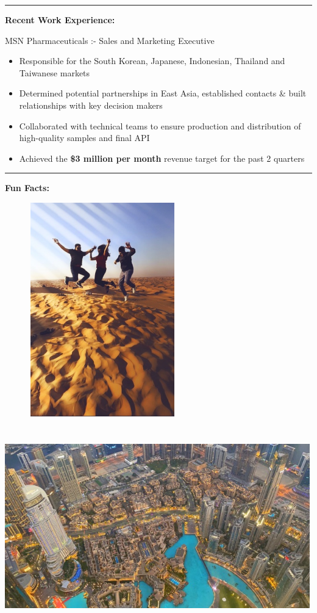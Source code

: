 \documentclass[
]{book}
\providecommand{\tightlist}{%
  \setlength{\itemsep}{0pt}\setlength{\parskip}{0pt}}
\theoremstyle{definition}
\theoremstyle{definition}
\theoremstyle{definition}
\theoremstyle{definition}
\theoremstyle{remark}
\begin{document}
\begin{center}\rule{0.5\linewidth}{0.5pt}\end{center}

\textbf{Recent Work Experience:}

MSN Pharmaceuticals :- Sales and Marketing Executive

\begin{itemize}
\tightlist
\item
  Responsible for the South Korean, Japanese, Indonesian, Thailand and Taiwanese markets
\item
  Determined potential partnerships in East Asia, established contacts \& built relationships with key decision makers
\item
  Collaborated with technical teams to ensure production and distribution of high-quality samples and final API
\item
  Achieved the \textbf{\$3 million per month} revenue target for the past 2 quarters
\end{itemize}

\begin{center}\rule{0.5\linewidth}{0.5pt}\end{center}

\textbf{Fun Facts:}

\includegraphics[width=3.33333in,height=3.64583in]{nikita4.jpeg} \includegraphics[width=5.20833in,height=3.64583in]{nikita5.jpeg}
\end{document}
